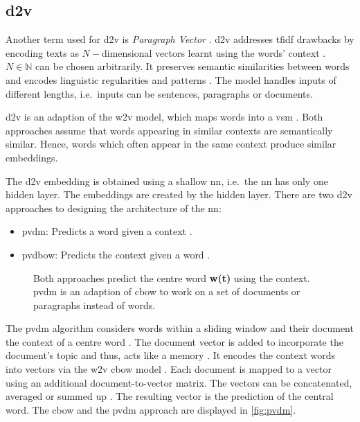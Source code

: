 \subsection{\acl*{d2v}}\label{subsec:doc2vec}

Another term used for \ac{d2v} is \textit{Paragraph Vector} \cite{clusteringDocs2020, SentRep2014}.
\ac{d2v} addresses \ac{tfidf} drawbacks by encoding texts as $N-$dimensional vectors learnt using the words' context \cite{clusteringDocs2020}.
$N \in \mathbb{N}$ can be chosen arbitrarily.
It preserves semantic similarities between words and encodes linguistic regularities and patterns \cite{SkipGram2013}.
The model handles inputs of different lengths, i.e.\ inputs can be sentences, paragraphs or documents.

\ac{d2v} is an adaption of the \ac{w2v} model, which maps words into a \ac{vsm} \cite{clusteringDocs2020}.
Both approaches assume that words appearing in similar contexts are semantically similar. 
Hence, words which often appear in the same context produce similar embeddings.

The \ac{d2v} embedding is obtained using a shallow \ac{nn}, i.e.\ the \ac{nn} has only one hidden layer.
The embeddings are created by the hidden layer.
There are two \ac{d2v} approaches to designing the architecture of the \ac{nn}:
\begin{itemize}
    \item \ac{pvdm}: 
        Predicts a word given a context \cite{SentRep2014, WordRep2013}.
    \item \ac{pvdbow}: 
        Predicts the context given a word \cite{EmbDist2015, SkipGram2013, SentRep2014}.
\end{itemize}

\begin{figure}%
    \centering
    \qquad
    \caption[\acs*{cbow} and \acs*{pvdm} architecture]{Both approaches predict the centre word \textbf{w(t)} using the context.
    \acs*{pvdm} is an adaption of \acs*{cbow} to work on a set of documents or paragraphs instead of words.
    }%
    \label{fig:pvdm}%
\end{figure}
 
The \ac{pvdm} algorithm considers words within a sliding window and their document the context of a centre word \cite{SentRep2014}.
The document vector is added to incorporate the document's topic and thus, acts like a memory \cite{SentRep2014, Top2Vec2020}.
It encodes the context words into vectors via the \ac{w2v} \ac{cbow} model \cite{glove2014}.
Each document is mapped to a vector using an additional document-to-vector matrix.
The vectors can be concatenated, averaged or summed up \cite{SentRep2014}.
The resulting vector is the prediction of the central word.
The \ac{cbow} and the \ac{pvdm} approach are displayed in \autoref{fig:pvdm}.